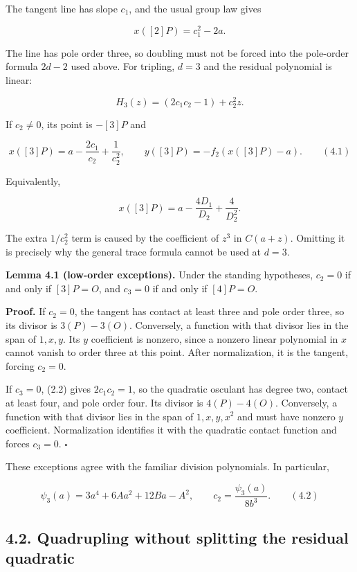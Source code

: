 \documentclass[
  11pt,
  a4paper,
]{article}
\begin{document}
The tangent line has slope \(c_1\), and the usual group law gives

\[
x([2]P)=c_1^2-2a.
\]

The line has pole order three, so doubling must not be forced into the
pole-order formula \(2d-2\) used above. For tripling, \(d=3\) and the
residual polynomial is linear:

\[
H_3(z)=(2c_1c_2-1)+c_2^2z.
\]

If \(c_2\neq0\), its point is \(-[3]P\) and

\[
x([3]P)=a-\frac{2c_1}{c_2}+\frac1{c_2^2},\qquad y([3]P)=-f_2(x([3]P)-a). \qquad (4.1)
\]

Equivalently,

\[
x([3]P)=a-\frac{4D_1}{D_2}+\frac4{D_2^2}.
\]

The extra \(1/c_2^2\) term is caused by the coefficient of \(z^3\) in
\(C(a+z)\). Omitting it is precisely why the general trace formula
cannot be used at \(d=3\).

\textbf{Lemma 4.1 (low-order exceptions).} Under the standing
hypotheses, \(c_2=0\) if and only if \([3]P=O\), and \(c_3=0\) if and
only if \([4]P=O\).

\textbf{Proof.} If \(c_2=0\), the tangent has contact at least three and
pole order three, so its divisor is \(3(P)-3(O)\). Conversely, a
function with that divisor lies in the span of \(1,x,y\). Its \(y\)
coefficient is nonzero, since a nonzero linear polynomial in \(x\)
cannot vanish to order three at this point. After normalization, it is
the tangent, forcing \(c_2=0\).

If \(c_3=0\), (2.2) gives \(2c_1c_2=1\), so the quadratic osculant has
degree two, contact at least four, and pole order four. Its divisor is
\(4(P)-4(O)\). Conversely, a function with that divisor lies in the span
of \(1,x,y,x^2\) and must have nonzero \(y\) coefficient. Normalization
identifies it with the quadratic contact function and forces \(c_3=0\).
\(\square\)

These exceptions agree with the familiar division polynomials. In
particular,

\[
\psi_3(a)=3a^4+6Aa^2+12Ba-A^2,\qquad c_2=\frac{\psi_3(a)}{8b^3}. \qquad (4.2)
\]

\subsection{4.2. Quadrupling without splitting the residual
quadratic}\label{quadrupling-without-splitting-the-residual-quadratic}
\end{document}
